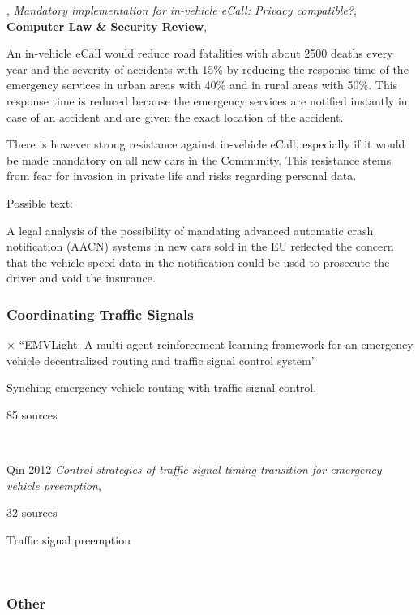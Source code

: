 \citep{GEUENS2010385},
{\it Mandatory implementation for in-vehicle eCall: Privacy compatible?},
{\bf Computer Law \& Security Review},

An in-vehicle
eCall would reduce road fatalities with about 2500 deaths
every year and the severity of accidents with 15\% by reducing
the response time of the emergency services in urban areas
with 40\% and in rural areas with 50\%. This response time is
reduced because the emergency services are notified instantly
in case of an accident and are given the exact location of the accident.

There is however strong resistance against in-vehicle
eCall, especially if it would be made mandatory on all new
cars in the Community. This resistance stems from fear for
invasion in private life and risks regarding personal data.

Possible text:

A legal analysis of the possibility of mandating advanced automatic crash notification (AACN) systems in new cars sold in the EU reflected the concern that the vehicle speed data in the notification could be used to prosecute the driver and void the insurance. \citep{GEUENS2010385}

\subsubsection{Coordinating Traffic Signals}

$\times $ \quad \citep{SU2023103955}
``EMVLight: A multi-agent reinforcement learning framework for an emergency vehicle decentralized routing and traffic signal control system''

Synching emergency vehicle routing with traffic signal control.

85 sources

\

\citep{QIN20121} Qin 2012
{\it Control strategies of traffic signal timing transition for emergency vehicle preemption},

32 sources

Traffic signal preemption

\



\subsubsection{Other}

